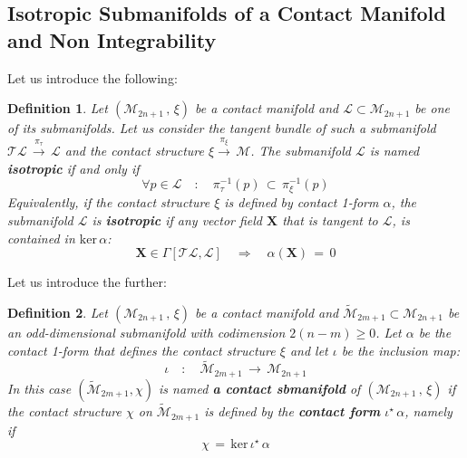 \documentclass[10pt,a4paper]{article}
\newtheorem{definizione}{Definition}[section]
\def\tilde{\widetilde}
\begin{document}
\subsection{Isotropic Submanifolds of a Contact Manifold and Non Integrability}
Let us introduce the following:
\begin{definizione}
Let $\left(\mathcal{M}_{2n+1}\, , \, \xi\right)$  be a contact manifold and  $\mathcal{L}\subset\mathcal{M}_{2n+1}$  be one of its
submanifolds. Let us consider the tangent bundle of such a submanifold
$\mathcal{TL}\,\stackrel{\pi_{\tau}}{\longrightarrow}\, \mathcal{L}$
and the contact structure $\xi
\stackrel{\pi_\xi}{\longrightarrow}\, \mathcal{M}$. The
submanifold $\mathcal{L}$  is named \textbf{isotropic} if and only if
\begin{equation}\label{isotropicamente}
    \forall p \in \mathcal{L} \quad  : \quad \pi_{\tau}^{-1}(p) \,
    \subset \, \pi_{\xi}^{-1}(p)
\end{equation}
Equivalently, if the contact structure  $\xi$  is defined by contact 1-form
$\alpha$, the submanifold
$\mathcal{L}$  is \textbf{isotropic} if
any vector field $\mathbf{X}$ that is tangent to $\mathcal{L}$,  is contained
in $\text{ker}\,\alpha$:
\begin{equation}\label{cundoiso}
\mathbf{X}\in \Gamma\left[\mathcal{TL},\mathcal{L}\right] \quad
\Rightarrow \quad \alpha(\mathbf{X}) \, = \, 0
\end{equation}
\end{definizione}
Let us introduce the further:
\begin{definizione}
Let $\left(\mathcal{M}_{2n+1}\, , \, \xi\right)$ be a contact manifold
and $\tilde{\mathcal{M}}_{2m+1} \subset \mathcal{M}_{2n+1}$
be an odd-dimensional submanifold with codimension
$2(n-m)\geq 0$. Let $\alpha$ be the contact 1-form that defines the contact structure
$\xi$ and let  $\iota$  be the  inclusion map:
\begin{equation}\label{includendoiota}
    \iota \quad : \quad \tilde{\mathcal{M}}_{2m+1} \,
    \longrightarrow \, \mathcal{M}_{2n+1}
\end{equation}
In this case  $\left(\tilde{\mathcal{M}}_{2m+1},\chi\right)$  is
named \textbf{a contact sbmanifold} of
$\left(\mathcal{M}_{2n+1}\, , \, \xi\right)$  if the contact structure
 $\chi$ on $\tilde{\mathcal{M}}_{2m+1}$  is defined
by the   \textbf{contact form} $\iota^\star \, \alpha$, namely if
\begin{equation}\label{cariota}
    \chi \, = \, {\mathrm{ker}} \, \iota^\star\,\alpha
\end{equation}
\end{definizione}
\end{document}
